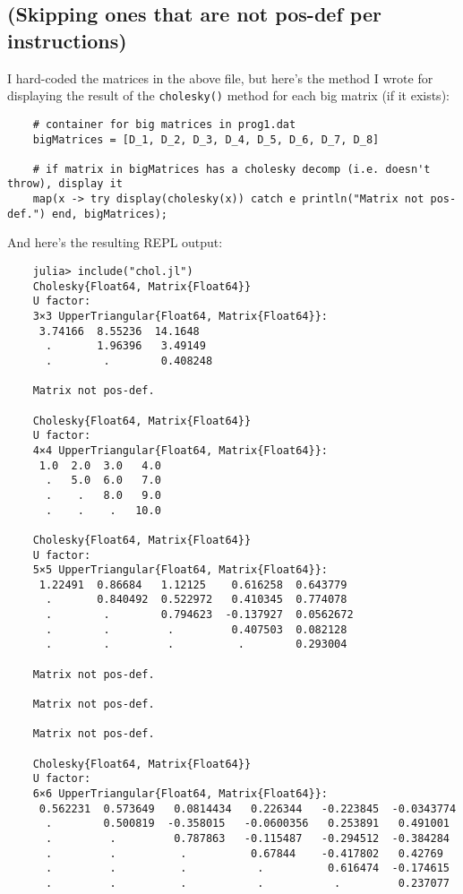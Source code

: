 \documentclass{article}
\begin{document}
    \subsection*{(Skipping ones that are not pos-def per instructions)}
    \bigbreak
    I hard-coded the matrices in the above file, but here's the method I wrote for displaying the result of the \texttt{cholesky()} 
    method for each big matrix (if it exists):
    \begin{Verbatim}
    # container for big matrices in prog1.dat
    bigMatrices = [D_1, D_2, D_3, D_4, D_5, D_6, D_7, D_8]
       
    # if matrix in bigMatrices has a cholesky decomp (i.e. doesn't throw), display it
    map(x -> try display(cholesky(x)) catch e println("Matrix not pos-def.") end, bigMatrices);
    \end{Verbatim}
    \bigbreak
    And here's the resulting REPL output:
    \bigbreak
    \begin{Verbatim}
    julia> include("chol.jl")
    Cholesky{Float64, Matrix{Float64}}
    U factor:
    3×3 UpperTriangular{Float64, Matrix{Float64}}:
     3.74166  8.55236  14.1648
      .       1.96396   3.49149
      .        .        0.408248

    Matrix not pos-def.

    Cholesky{Float64, Matrix{Float64}}
    U factor:
    4×4 UpperTriangular{Float64, Matrix{Float64}}:
     1.0  2.0  3.0   4.0
      .   5.0  6.0   7.0
      .    .   8.0   9.0
      .    .    .   10.0

    Cholesky{Float64, Matrix{Float64}}
    U factor:
    5×5 UpperTriangular{Float64, Matrix{Float64}}:
     1.22491  0.86684   1.12125    0.616258  0.643779
      .       0.840492  0.522972   0.410345  0.774078
      .        .        0.794623  -0.137927  0.0562672
      .        .         .         0.407503  0.082128
      .        .         .          .        0.293004

    Matrix not pos-def.

    Matrix not pos-def.
    
    Matrix not pos-def.

    Cholesky{Float64, Matrix{Float64}}
    U factor:
    6×6 UpperTriangular{Float64, Matrix{Float64}}:
     0.562231  0.573649   0.0814434   0.226344   -0.223845  -0.0343774
      .        0.500819  -0.358015   -0.0600356   0.253891   0.491001
      .         .         0.787863   -0.115487   -0.294512  -0.384284
      .         .          .          0.67844    -0.417802   0.42769
      .         .          .           .          0.616474  -0.174615
      .         .          .           .           .         0.237077
    \end{Verbatim}
\end{document}
